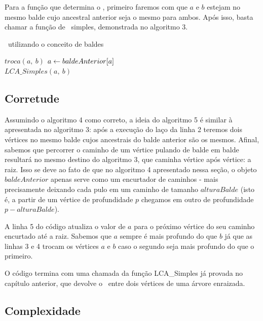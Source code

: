 Para a função que determina o \LCA, primeiro faremos com que $a$ e $b$ estejam no mesmo balde cujo ancestral anterior seja o mesmo para ambos. Após isso, basta chamar a função de \LCA\ simples, demonstrada no algoritmo 3.

\vspace{0.3cm}

\begin{algorithm}[H]
\caption{\LCA\ utilizando o conceito de baldes}
\begin{algorithmic}[1]
            \State $troca(a,\ b)$
        \State $a \leftarrow baldeAnterior[a]$
        \EndIf
    \EndWhile
    \\\hspace{5mm} \Return $LCA\_Simples(a,\ b)$
\EndFunction
\end{algorithmic}
\end{algorithm}

\subsection{Corretude}

Assumindo o algoritmo 4 como correto, a ideia do algoritmo 5 é similar à apresentada no algoritmo 3: após a execução do laço da linha 2 teremos dois vértices no mesmo balde cujos ancestrais do balde anterior são os mesmos. Afinal, sabemos que percorrer o caminho de um vértice pulando de balde em balde resultará no mesmo destino do algoritmo 3, que caminha vértice após vértice: a raiz. Isso se deve ao fato de que no algoritmo 4 apresentado nessa seção, o objeto $baldeAnterior$ apenas serve como um encurtador de caminhos - mais precisamente deixando cada pulo em um caminho de  tamanho $alturaBalde$ (isto é, a partir de um vértice de profundidade $p$ chegamos em outro de profundidade $p - alturaBalde$).

A linha 5 do código atualiza o valor de $a$ para o próximo vértice do seu caminho encurtado até a raiz. Sabemos que $a$ sempre é mais profundo do que $b$ já que as linhas 3 e 4 trocam os vértices $a$ e $b$ caso o segundo seja mais profundo do que o primeiro.

O código termina com uma chamada da função LCA\_Simples já provada no capítulo anterior, que devolve o \LCA\ entre dois vértices de uma árvore enraizada.

\subsection{Complexidade}
\label{complexidade-balde}

